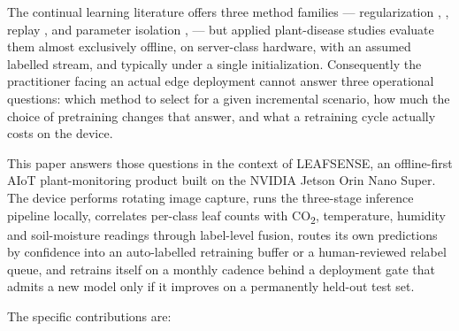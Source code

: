 \documentclass[journal]{IEEEtran}
\begin{document}
The continual learning literature offers three method families ---
regularization \cite{ref15}, \cite{ref16}, replay \cite{ref17}, \cite{ref18} and
parameter isolation \cite{ref19}, \cite{ref20} --- but applied plant-disease studies
evaluate them almost exclusively offline, on server-class hardware, with an assumed
labelled stream, and typically under a single initialization. Consequently the
practitioner facing an actual edge deployment cannot answer three operational
questions: which method to select for a given incremental scenario, how much the
choice of pretraining changes that answer, and what a retraining cycle actually costs
on the device.

This paper answers those questions in the context of LEAFSENSE, an offline-first
AIoT plant-monitoring product built on the NVIDIA Jetson Orin Nano Super. The device
performs rotating image capture, runs the three-stage inference pipeline locally,
correlates per-class leaf counts with CO\textsubscript{2}, temperature, humidity and
soil-moisture readings through label-level fusion, routes its own predictions by
confidence into an auto-labelled retraining buffer or a human-reviewed relabel queue,
and retrains itself on a monthly cadence behind a deployment gate that admits a new
model only if it improves on a permanently held-out test set.

\noindent The specific contributions are:
\end{document}
